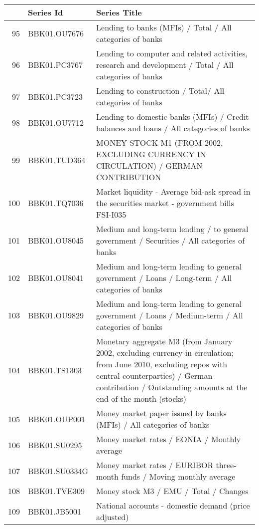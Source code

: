 \documentclass[11pt]{article}
\begin{document}
\begin{table}
\centering
\begin{tabular}{rp{5cm}p{11cm}}
& \textbf{Series Id} & \textbf{Series Title} \\
  \hline
  \hline
  95 & BBK01.OU7676 & Lending to banks (MFIs) / Total / All categories of banks \\ 
  \hline
  96 & BBK01.PC3767 & Lending to computer and related activities, research and development / Total / All categories of banks \\ 
  \hline
  97 & BBK01.PC3723 & Lending to construction / Total/ All categories of banks \\ 
  \hline
  98 & BBK01.OU7712 & Lending to domestic banks (MFIs) / Credit balances and loans / All categories of banks \\ 
  \hline
  99 & BBK01.TUD364 & MONEY STOCK M1 (FROM 2002, EXCLUDING CURRENCY IN CIRCULATION) / GERMAN CONTRIBUTION \\ 
  \hline
  100 & BBK01.TQ7036 & Market liquidity - Average bid-ask spread in the securities market - government bills                          FSI-I035 \\ 
  \hline
  101 & BBK01.OU8045 & Medium and long-term lending / to general government / Securities / All categories of banks \\ 
  \hline
  102 & BBK01.OU8041 & Medium and long-term lending to general government / Loans / Long-term / All categories of banks \\ 
  \hline
  103 & BBK01.OU9829 & Medium and long-term lending to general government / Loans / Medium-term / All categories of banks \\ 
  \hline
  104 & BBK01.TS1303 & Monetary aggregate M3 (from January 2002, excluding currency in circulation; from June 2010, excluding repos with central counterparties) / German contribution / Outstanding amounts at the end of the month (stocks) \\ 
  \hline
  105 & BBK01.OUP001 & Money market paper issued by banks (MFIs) / All categories of banks \\ 
  \hline
  106 & BBK01.SU0295 & Money market rates / EONIA / Monthly average \\ 
  \hline
  107 & BBK01.SU0334G & Money market rates / EURIBOR three-month funds / Moving monthly average \\ 
  \hline
  108 & BBK01.TVE309 & Money stock M3 / EMU / Total / Changes \\ 
  \hline
  109 & BBK01.JB5001 & National accounts - domestic demand (price adjusted) \\ 

\end{tabular}
\end{table}
\end{document}
